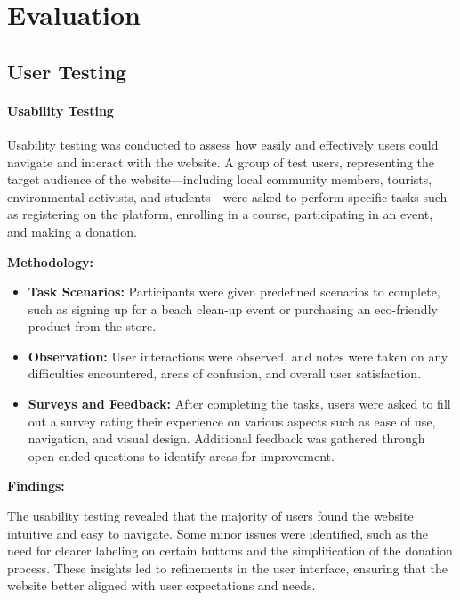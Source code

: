 \chapter{Evaluation}
\label{ch:evaluation}

\section{User Testing}

\subsubsection{Usability Testing}

Usability testing was conducted to assess how easily and effectively users could navigate and interact with the website. A group of test users, representing the target audience of the website—including local community members, tourists, environmental activists, and students—were asked to perform specific tasks such as registering on the platform, enrolling in a course, participating in an event, and making a donation.

\textbf{Methodology:}

\begin{itemize}
    \item \textbf{Task Scenarios:} Participants were given predefined scenarios to complete, such as signing up for a beach clean-up event or purchasing an eco-friendly product from the store.
    \item \textbf{Observation:} User interactions were observed, and notes were taken on any difficulties encountered, areas of confusion, and overall user satisfaction.
    \item \textbf{Surveys and Feedback:} After completing the tasks, users were asked to fill out a survey rating their experience on various aspects such as ease of use, navigation, and visual design. Additional feedback was gathered through open-ended questions to identify areas for improvement.
\end{itemize}

\textbf{Findings:}

The usability testing revealed that the majority of users found the website intuitive and easy to navigate. Some minor issues were identified, such as the need for clearer labeling on certain buttons and the simplification of the donation process. These insights led to refinements in the user interface, ensuring that the website better aligned with user expectations and needs.

